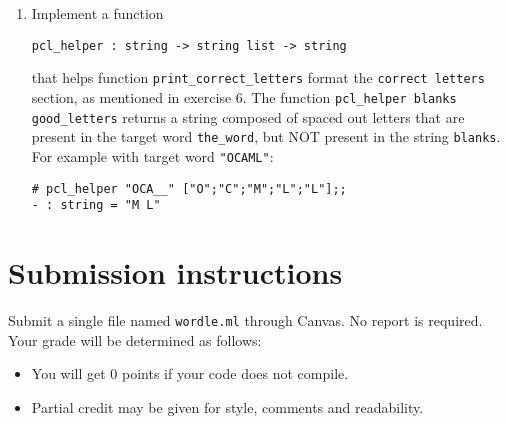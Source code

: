 \documentclass{article}
\newcommand{\code}[1]{\lstinline!#1!}
\begin{document}
\begin{enumerate}
\item Implement a function

  \begin{center}
    \code{pcl_helper : string -> string list -> string}
  \end{center}
that helps function \code{print_correct_letters} format the \code{correct letters} section, as mentioned in exercise 6. The function \code{pcl_helper blanks good_letters} returns a string composed of spaced out letters that are present in the target word \code{the_word}, but NOT present in the string \code{blanks}. For example with target word \code{"OCAML"}:
\begin{lstlisting}
# pcl_helper "OCA__" ["O";"C";"M";"L";"L"];;
- : string = "M L"
\end{lstlisting}


\end{enumerate}
\section{Submission instructions}
Submit a single file named \texttt{wordle.ml} through Canvas. No report is required. Your
grade will be determined as follows:
\begin{itemize}
\item You will get 0 points if your code does not compile.
\item Partial credit may be given for style, comments and readability.
\end{itemize}
\end{document}
